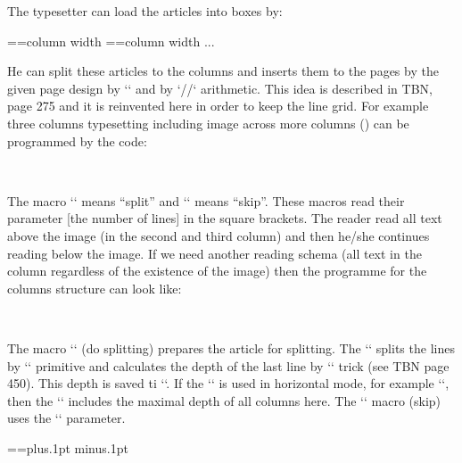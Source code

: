 \begtt
\par\maybebreak 3.5cm 
\endtt

 


The typesetter can load the articles into boxes by: 

\begtt
\setbox\articleA=\vbox{\hsize=column width   } 
\setbox\articleB=\vbox{\hsize=column width   } 
... 
\endtt


He can split these articles to the columns and inserts them to the pages by the given page design by `\vsplit` and by `\hbox/\vbox/\vtop` arithmetic. This idea is described in TBN, page 275 and it is reinvented here in order to keep the line grid. For example three columns typesetting including image across more columns () can be programmed by the code: 

\begtt
\ulamuj\articleA 
\hbox{\ulom[18]\kern\colsep 
      } 
\endtt


The macro `\ulom` means “split” and `\vynech` means “skip”. These macros read their parameter [the number of lines] in the square brackets. The reader read all text above the image (in the second and third column) and then he/she continues reading below the image. If we need another reading schema (all text in the column regardless of the existence of the image) then the programme for the columns structure can look like: 

\begtt
\hbox{\ulom[21]\kern\colsep 
      \kern\colsep 
      \vtop{\ulom[3]\vynech[14]\ulom[4]}%
     } 
\endtt


The macro `\ulamuj` (do splitting) prepares the article for splitting. The `\ulom` splits the lines by `\vsplit` primitive and calculates the depth of the last line by `\lastbox` trick (see TBN page 450). This depth is saved ti `\lastdepth`. If the `\ulom` is used in horizontal mode, for example `\hbox{\ulom[9]\ulom[9]\ulom[9]}`, then the `\lastdepth` includes the maximal depth of all columns here. The `\vynech` macro (skip) uses the `\lastdepth` parameter. 

\begtt
\tmpdim=\baselineskip  \splittopskip=\tmpdim plus.1pt minus.1pt 
\def\ulom[#1]{\setbox0=\vsplit\wholebox to #1\baselineskip 
   \vtop{\kern-.3\baselineskip \unvbox0 
         \nointerlineskip\lastbox \global\lastdepth=\prevdepth}%
   \ifhmode \ifdim\lastdepth<\maxhdepth \global\lastdepth=\maxhdepth \fi 
            \maxhdepth=\lastdepth \fi 
} 
\def\ulamuj#1{\let\wholebox=#1\setbox0=\vsplit\wholebox to0pt} 
\def\vynech[#1]{\vskip-.7\baselineskip\vskip#1\baselineskip \prevdepth=\lastdepth} 
\endtt


